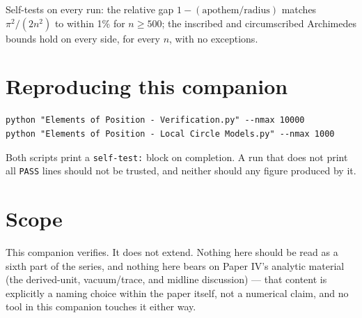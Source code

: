 \documentclass[10pt,a4paper]{article}
\begin{document}
Self-tests on every run: the relative gap $1 - (\text{apothem}/\text{radius})$
matches $\pi^2/(2n^2)$ to within 1\% for $n \geq 500$; the inscribed and
circumscribed Archimedes bounds hold on every side, for every $n$, with
no exceptions.

\section{Reproducing this companion}

\begin{verbatim}
python "Elements of Position - Verification.py" --nmax 10000
python "Elements of Position - Local Circle Models.py" --nmax 1000
\end{verbatim}

Both scripts print a \texttt{self-test:} block on completion. A run that
does not print all \texttt{PASS} lines should not be trusted, and neither
should any figure produced by it.

\section{Scope}

This companion verifies. It does not extend. Nothing here should be read
as a sixth part of the series, and nothing here bears on Paper IV's
analytic material (the derived-unit, vacuum/trace, and midline
discussion) --- that content is explicitly a naming choice within the
paper itself, not a numerical claim, and no tool in this companion
touches it either way.
\end{document}
